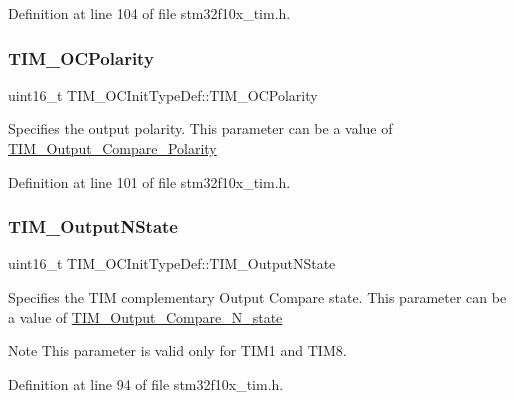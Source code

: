 Definition at line 104 of file stm32f10x\+\_\+tim.\+h.

\mbox{\label{struct_t_i_m___o_c_init_type_def_a9ed3e2de4700d008729a916d8ba78486}} 
\subsubsection{\texorpdfstring{T\+I\+M\+\_\+\+O\+C\+Polarity}{TIM\_OCPolarity}}
{\footnotesize\ttfamily uint16\+\_\+t T\+I\+M\+\_\+\+O\+C\+Init\+Type\+Def\+::\+T\+I\+M\+\_\+\+O\+C\+Polarity}

Specifies the output polarity. This parameter can be a value of \hyperlink{group___t_i_m___output___compare___polarity}{T\+I\+M\+\_\+\+Output\+\_\+\+Compare\+\_\+\+Polarity} 

Definition at line 101 of file stm32f10x\+\_\+tim.\+h.

\mbox{\label{struct_t_i_m___o_c_init_type_def_a933904d2f892d0b945a908b9257fe869}} 
\subsubsection{\texorpdfstring{T\+I\+M\+\_\+\+Output\+N\+State}{TIM\_OutputNState}}
{\footnotesize\ttfamily uint16\+\_\+t T\+I\+M\+\_\+\+O\+C\+Init\+Type\+Def\+::\+T\+I\+M\+\_\+\+Output\+N\+State}

Specifies the T\+IM complementary Output Compare state. This parameter can be a value of \hyperlink{group___t_i_m___output___compare___n__state}{T\+I\+M\+\_\+\+Output\+\_\+\+Compare\+\_\+\+N\+\_\+state} \begin{DoxyNote}{Note}
This parameter is valid only for T\+I\+M1 and T\+I\+M8. 
\end{DoxyNote}


Definition at line 94 of file stm32f10x\+\_\+tim.\+h.

